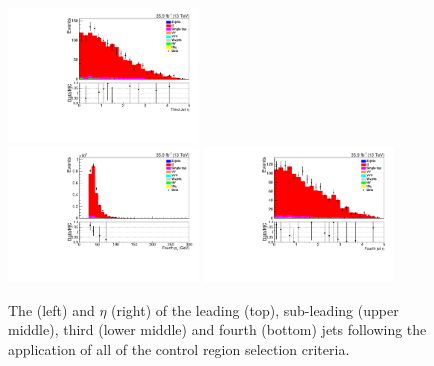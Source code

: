 \begin{figure}[ht]
\includegraphics[width=0.45\textwidth]{figs/background-estimation/plots/unblinded/ttbar_control/thirdJetEta_SingleTop_wMass_emu.pdf}
\\
\includegraphics[width=0.45\textwidth]{figs/background-estimation/plots/unblinded/ttbar_control/fourthJetPt_SingleTop_wMass_emu.pdf}
\includegraphics[width=0.45\textwidth]{figs/background-estimation/plots/unblinded/ttbar_control/fourthJetEta_SingleTop_wMass_emu.pdf}
\caption{
The \pT (left) and $\eta$ (right) of the leading (top), sub-leading (upper middle), third (lower middle) and fourth (bottom) jets following the application of all of the \ttbar control region selection criteria.
}
\label{fig:App_ttbar_jetsKinematics_wMass}
\end{figure}